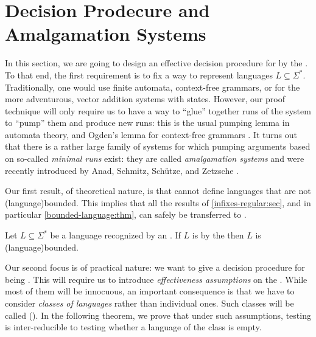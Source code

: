 \section{Decision Prodecure and Amalgamation Systems}
\label{infixes-amalgamation:sec}

\AP In this section, we are going to design an effective decision procedure for
 by the . To that end, the first
requirement is to fix a way to represent languages $L \subseteq \Sigma^*$.
Traditionally, one would use finite automata, context-free grammars, or for the
more adventurous, vector addition systems with states. However, our proof
technique will only require us to have a way to ``glue'' together runs of the
system to ``pump'' them and produce new runs: this is the usual pumping lemma
in automata theory, and Ogden's lemma for context-free grammars \cite{OGDEN68}.
It turns out that there is a rather large family of systems for which pumping
arguments based on so-called \emph{minimal runs} exist: they are called
\emph{amalgamation systems} and were recently introduced by Anad, Schmitz,
Schütze, and Zetzsche \cite{ASZZ24}.

\AP Our first result, of theoretical nature, is that 
cannot define  languages that are not
\kl(language){bounded}. This implies that all the results of
\cref{infixes-regular:sec}, and in
particular \cref{bounded-language:thm}, can safely be transferred to
.

\begin{theorem}[label=infix-amalgamation:thm,restate=infix-amalgamation:thm]
    Let $L \subseteq \Sigma^*$ be a language recognized by an 
    .
    If $L$ is  by the  then $L$ is
    \kl(language){bounded}.
\end{theorem}

\AP Our second focus is of practical nature: we want to give a decision
procedure for being . This will require us to introduce
\emph{effectiveness assumptions} on the . While most
of them will be innocuous, an important consequence is that we have to consider
\emph{classes of languages} rather than individual ones. Such classes will be
called  (). In the following theorem, we prove that under such assumptions,
testing  is inter-reducible to testing whether a
language of the class is empty.


